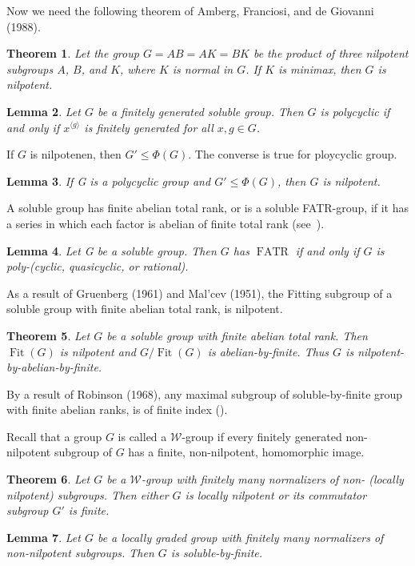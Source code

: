 \documentclass[11pt]{amsart}
\newtheorem{theorem}{Theorem}[section]
\newtheorem{lemma}[theorem]{Lemma}
\DeclareMathOperator{\Fit}{Fit}
\DeclareMathOperator{\FATR}{FATR}
\newcommand{\sub}{\leqslant}
\newcommand{\cyc}[1]{\langle #1\rangle}
\begin{document}
Now we need the following theorem of  Amberg, Franciosi, and de Giovanni (1988).
\begin{theorem}\cite[Theorem 6.3.4]{AmFrGi}\label{Amb}
 Let the group $G = AB = AK = BK$ be the product of three nilpotent subgroups $A$, $B$, and $K$, where $K$ is normal in $G$. If $K$ is minimax, then $G$ is nilpotent. 
\end{theorem}

\begin{lemma}\cite[4.6.4]{LeRob}\label{L-2.2}
Let $G$ be a finitely generated soluble group. Then $G$ is polycyclic if and only if $x^{\cyc{g}}$ is finitely generated for all $x, g \in G$.
\end{lemma}

If $G$ is nilpotenen, then $G'\sub\Phi(G)$. The converse is true for ploycyclic group.
\begin{lemma}\cite[4.5.20]{Rob}\label{L-2.2.1}
If G is a polycyclic group and $G'\sub \Phi(G)$, then $G$ is nilpotent. 
\end{lemma}

A soluble group has finite abelian total rank, or is a soluble FATR-group, if it has a series in which each factor is abelian of finite total rank (see~\cite[Page: 85 ]{LeRob}).

\begin{lemma}\cite[5.1.6 (ii)]{LeRob}\label{L-2.3}
Let G be a soluble group. Then $G$ has $\FATR$  if and only if $G$ is poly-(cyclic, quasicyclic, or rational).
\end{lemma}

As a result of Gruenberg (1961) and Mal’cev (1951), the Fitting subgroup of  a soluble group with finite abelian total rank, is nilpotent.
\begin{theorem}\cite[5.2.2]{LeRob}\label{T-2.4}
 Let $G$ be a soluble group with finite abelian total rank. Then $\Fit(G)$ is nilpotent and $G/ \Fit(G)$ is abelian-by-finite. Thus $G$
is nilpotent-by-abelian-by-finite.
\end{theorem}

By a result of Robinson (1968), any maximal subgroup of soluble-by-finite group with finite abelian ranks, is of finite index (\cite[5.2.12]{LeRob}).

Recall that a group $G$ is called a $\mathcal{W}$-group if every finitely generated non-nilpotent subgroup of $G$ has a finite, non-nilpotent, homomorphic image. 

\begin{theorem}\cite[Theorem A]{MaGi}\label{T-2.6}
Let $G$ be a $\mathcal{W}$-group with finitely many normalizers of non- (locally nilpotent) subgroups. Then either $G$ is locally nilpotent or its commutator subgroup $G'$ is finite.
\end{theorem}
\begin{lemma}\cite[Corollary 2.3.]{MaGi}\label{L-2.7}
 Let $G$ be a locally graded group with finitely many normalizers of  non-nilpotent subgroups. Then $G$ is soluble-by-finite.
\end{lemma}
\end{document}
